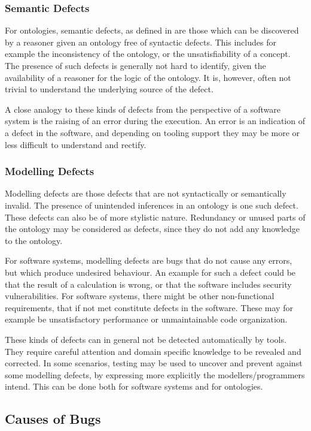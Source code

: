 \begin{example}
\end{example}

\subsubsection{Semantic Defects} \label{semantic-defects}

For ontologies, semantic defects, as defined in \cite{kalyanpur2005debugging}  are those which can be discovered by a reasoner given an ontology free of syntactic defects. This includes for example the inconsistency of the ontology, or the unsatisfiability of a concept. The presence of such defects is generally not hard to identify, given the availability of a reasoner for the logic of the ontology. It is, however, often not trivial to understand the underlying source of the defect.

\begin{example}
\end{example}

A close analogy to these kinds of defects from the perspective of a software system is the raising of an error during the execution. An error is an indication of a defect in the software, and depending on tooling support they may be more or less difficult to understand and rectify.

\subsubsection{Modelling Defects} \label{modelling-defects}

Modelling defects are those defects that are not syntactically or semantically invalid. The presence of unintended inferences in an ontology is one such defect. These defects can also be of more stylistic nature. Redundancy or unused parts of the ontology may be considered as defects, since they do not add any knowledge to the ontology.

For software systems, modelling defects are bugs that do not cause any errors, but which produce undesired behaviour. An example for such a defect could be that the result of a calculation is wrong, or that the software includes security vulnerabilities. For software systems, there might be other non-functional requirements, that if not met constitute defects in the software. These may for example be unsatisfactory performance or unmaintainable code organization.

These kinds of defects can in general not be detected automatically by tools. They require careful attention and domain specific knowledge to be revealed and corrected. In some scenarios, testing may be used to uncover and prevent against some modelling defects, by expressing more explicitly the modellers/programmers intend. This can be done both for software systems and for ontologies.

\subsection{Causes of Bugs} \label{causes-of-bugs}

